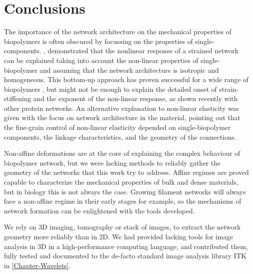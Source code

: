 
\chapter{Conclusions}
\label{Chapter-Conclusions}

The importance of the network architecture on the mechanical properties of biopolymers is often obscured by focussing on the properties of single-components. \cite{storm_nonlinear_2005}, demonstrated that the nonlinear response of a strained network can be explained taking into account the non-linear properties of single-biopolymer and assuming that the network architecture is isotropic and homogeneous. This bottom-up approach has proven successful for a wide range of biopolymers \cite{carrillo_nonlinear_2013}, but might not be enough to explain the detailed onset of strain-stiffening and the exponent of the non-linear response, as shown recently with other protein networks\cite{licup_stress_2015}. An alternative explanation to non-linear elasticity was given with the focus on network architecture in the material\cite{onck_alternative_2005}, pointing out that the fine-grain control of non-linear elasticity depended on single-biopolymer components, the linkage characteristics, and the geometry of the connections.


Non-affine deformations are at the core of explaining the complex behaviour of biopolymer network, but we were lacking methods to reliably gather the geometry of the networks that this work try to address. Affine regimes are proved capable to characterize the mechanical properties of bulk and dense materials, but in biology this is not always the case. Growing filament networks will always face a non-affine regime in their early stages for example, so the mechanisms of network formation can be enlightened with the tools developed.

We rely on 3D imaging, tomography or stack of images, to extract the network geometry more reliably than in 2D. We had provided lacking tools for image analysis in 3D in a high-performance computing language, and contributed them, fully tested and documented to the de-facto standard image analysis library ITK in \autoref{Chapter-Wavelets}.

